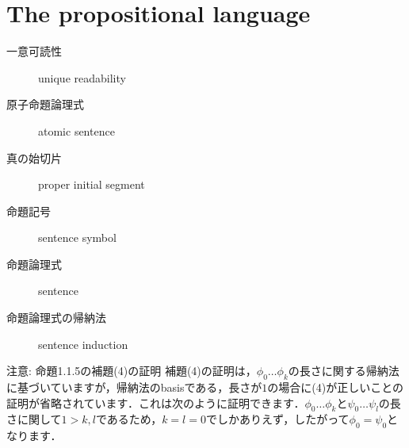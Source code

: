 \section{The propositional language}

\begin{myfrm}[訳語対応]
  \begin{description}
    \item[一意可読性] unique readability
    \item[原子命題論理式] atomic sentence
    \item[真の始切片] proper initial segment
    \item[命題記号] sentence symbol
    \item[命題論理式] sentence
    \item[命題論理式の帰納法] sentence induction
  \end{description}
\end{myfrm}



\begin{excfield}{注意: 命題1.1.5の補題(4)の証明}
  補題(4)の証明は，$\phi_0 \dots \phi_k$の長さに関する帰納法に基づいていますが，帰納法のbasisである，長さが$1$の場合に(4)が正しいことの証明が省略されています．これは次のように証明できます．$\phi_0 \dots \phi_k$と$\psi_0 \dots \psi_l$の長さに関して$1 > k, l$であるため，$k = l = 0$でしかありえず，したがって$\phi_0 = \psi_0$となります．
\end{excfield}



